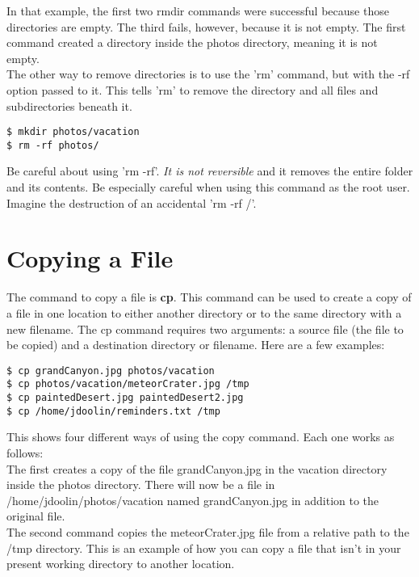 In that example, the first two rmdir commands were successful because those directories are empty.  The third fails, however, because it is not empty.  The first command created a directory inside the photos directory, meaning it is not empty.\\

The other way to remove directories is to use the 'rm' command, but with the -rf option passed to it.  This tells 'rm' to remove the directory and all files and subdirectories beneath it.

\begin{verbatim}
$ mkdir photos/vacation
$ rm -rf photos/
\end{verbatim}

Be careful about using 'rm -rf'.  \textit{It is not reversible} and it removes the entire folder and its contents.  Be especially careful when using this command as the root user.  Imagine the destruction of an accidental 'rm -rf /'.

\section{Copying a File}

The command to copy a file is \textbf{cp}.  This command can be used to create a copy of a file in one location to either another directory or to the same directory with a new filename.  The cp command requires two arguments: a source file (the file to be copied) and a destination directory or filename.  Here are a few examples:

\begin{verbatim}
$ cp grandCanyon.jpg photos/vacation
$ cp photos/vacation/meteorCrater.jpg /tmp
$ cp paintedDesert.jpg paintedDesert2.jpg
$ cp /home/jdoolin/reminders.txt /tmp
\end{verbatim}

This shows four different ways of using the copy command.  Each one works as follows:\\

The first creates a copy of the file grandCanyon.jpg in the vacation directory inside the photos directory.  There will now be a file in /home/jdoolin/photos/vacation named grandCanyon.jpg in addition to the original file.\\

The second command copies the meteorCrater.jpg file from a relative path to the /tmp directory.  This is an example of how you can copy a file that isn't in your present working directory to another location.\\


